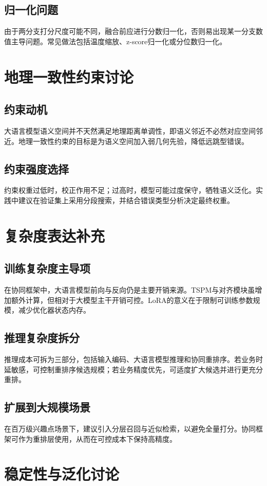 \subsection{归一化问题}
由于两分支打分尺度可能不同，融合前应进行分数归一化，否则易出现某一分支数值主导问题。常见做法包括温度缩放、z-score归一化或分位数归一化。

\section{地理一致性约束讨论}
\subsection{约束动机}
大语言模型语义空间并不天然满足地理距离单调性，即语义邻近不必然对应空间邻近。地理一致性约束的目标是为语义空间加入弱几何先验，降低远跳型错误。

\subsection{约束强度选择}
约束权重过低时，校正作用不足；过高时，模型可能过度保守，牺牲语义泛化。实践中建议在验证集上采用分段搜索，并结合错误类型分析决定最终权重。

\section{复杂度表达补充}
\subsection{训练复杂度主导项}
在协同框架中，大语言模型前向与反向仍是主要开销来源。TSPM与对齐模块虽增加额外计算，但相对于大模型主干开销可控。LoRA的意义在于限制可训练参数规模，减少优化器状态内存。

\subsection{推理复杂度拆分}
推理成本可拆为三部分，包括输入编码、大语言模型推理和协同重排序。若业务时延敏感，可控制重排序候选规模；若业务精度优先，可适度扩大候选并进行更充分重排。

\subsection{扩展到大规模场景}
在百万级兴趣点场景下，建议引入分层召回与近似检索，以避免全量打分。协同框架可作为重排层使用，从而在可控成本下保持高精度。

\section{稳定性与泛化讨论}
